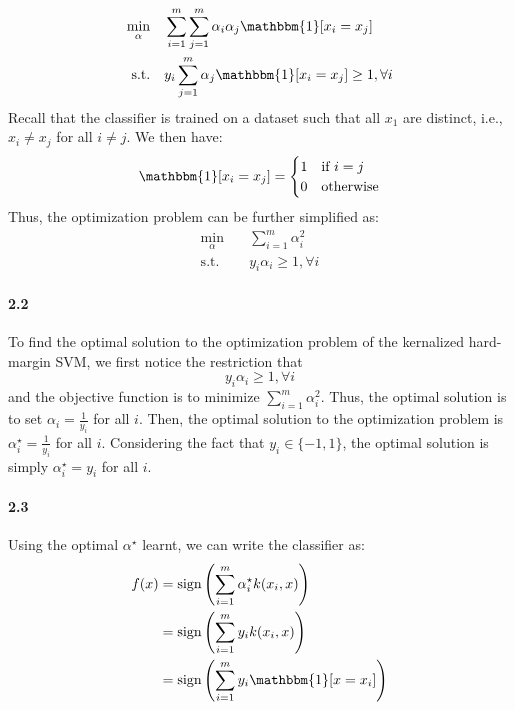 \documentclass[11pt]{article}
\begin{document}
\begin{equation}
    \begin{split}
        \min_{\alpha} \quad &\sum_{i=1}^m \sum_{j=1}^m \alpha_i \alpha_j \mathbbm{1}[x_i = x_j] \\
        \text{s.t.} \quad &y_i \sum_{j=1}^m \alpha_j \mathbbm{1}[x_i = x_j] \geq 1, \forall i
    \end{split}
\end{equation}
Recall that the classifier is trained on a dataset such that all $x_1$ are distinct, i.e., $x_i \neq x_j$ for all $i \neq j$. We then have:
\begin{equation}
\mathbbm{1}[x_i = x_j] = \begin{cases}
    1 & \text{if } i=j \\
    0 & \text{otherwise}
\end{cases}
\end{equation}
Thus, the optimization problem can be further simplified as:
\begin{equation}
    \begin{split}
        \min_{\alpha} \quad &\sum_{i=1}^m \alpha_i^2 \\
        \text{s.t.} \quad &y_i \alpha_i \geq 1, \forall i
    \end{split}
\end{equation}
\paragraph{2.2}
To find the optimal solution to the optimization problem of the kernalized hard-margin SVM, we first notice the restriction that 
\begin{equation}
    y_i \alpha_i \geq 1, \forall i
\end{equation}
and the objective function is to minimize $\sum_{i=1}^m \alpha_i^2$. Thus, the optimal solution is to set $\alpha_i = \frac{1}{y_i}$ for all $i$. Then, the optimal solution to the optimization problem is $\alpha^\star_i = \frac{1}{y_i}$ for all $i$. Considering the fact that $y_i \in \{-1, 1\}$, the optimal solution is simply $\alpha^\star_i = y_i$ for all $i$.
\paragraph{2.3}

Using the optimal $\alpha^\star$ learnt, we can write the classifier as:
\begin{equation}
    \begin{split}
        f(x) &= \text{sign} \left( \sum_{i=1}^m \alpha^\star_i k(x_i, x) \right) \\
        &= \text{sign} \left( \sum_{i=1}^m y_i k(x_i, x) \right) \\
        &= \text{sign} \left( \sum_{i=1}^m y_i \mathbbm{1}[x=x_i] \right)
    \end{split}
\end{equation}
\end{document}
